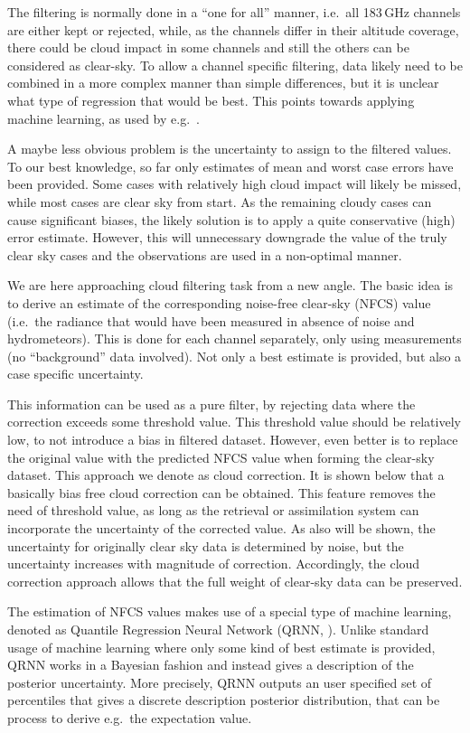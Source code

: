 \documentclass[amt, manuscript]{copernicus}
\begin{document}
The filtering is normally done in a ``one for all'' manner, i.e.\ all 183\,GHz
channels are either kept or rejected, while, as the channels differ in their
altitude coverage, there could be cloud impact in some channels and still the
others can be considered as clear-sky. To allow a channel specific filtering,
data likely need to be combined in a more complex manner than simple
differences, but it is unclear what type of regression that would be best. This
points towards applying machine learning, as used by e.g.\
\citet{favrichon2019detecting}.

A maybe less obvious problem is the uncertainty to assign to the filtered
values. To our best knowledge, so far only estimates of mean and worst case
errors have been provided. Some cases with relatively high cloud impact will
likely be missed, while most cases are clear sky from start. As the remaining
cloudy cases can cause significant biases, the likely solution is to apply a
quite conservative (high) error estimate. However, this will unnecessary
downgrade the value of the truly clear sky cases and the observations are used
in a non-optimal manner.

We are here approaching cloud filtering task from a new angle. The basic idea
is to derive an estimate of the corresponding noise-free clear-sky (NFCS) value
(i.e.\ the radiance that would have been measured in absence of noise and
hydrometeors). This is done for each channel separately, only using
measurements (no ``background'' data involved). Not only a best estimate is
provided, but also a case specific uncertainty.

This information can be used as a pure filter, by rejecting data where the
correction exceeds some threshold value. This threshold value should be
relatively low, to not introduce a bias in filtered dataset. However, even
better is to replace the original value with the predicted NFCS value when
forming the clear-sky dataset. This approach we denote as cloud correction. It
is shown below that a basically bias free cloud correction can be obtained.
This feature removes the need of threshold value, as long as the retrieval or
assimilation system can incorporate the uncertainty of the corrected value. As
also will be shown, the uncertainty for originally clear sky data is determined
by noise, but the uncertainty increases with magnitude of correction.
Accordingly, the cloud correction approach allows that the full weight of
clear-sky data can be preserved.

The estimation of NFCS values makes use of a special type of machine learning,
denoted as Quantile Regression Neural Network (QRNN,
\citet{pfreundschuh:aneur:18}). Unlike standard usage of machine learning where
only some kind of best estimate is provided, QRNN works in a Bayesian fashion
and instead gives a description of the posterior uncertainty. More precisely,
QRNN outputs an user specified set of percentiles that gives a discrete
description posterior distribution, that can be process to derive e.g.\ the
expectation value.
\end{document}
